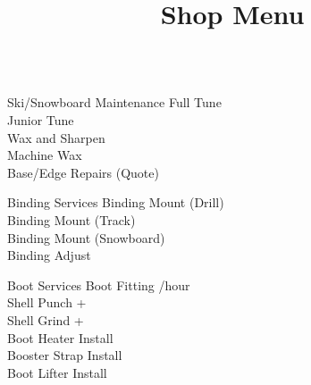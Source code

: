 \documentclass{beamer}
\title{Shop Menu}
\begin{document}
  \begin{frame}[fragile]\centering
    \begin{columns}[T]
        \begin{column}{0.90\textwidth}
            \begin{block}{Ski/Snowboard Maintenance}
                Full Tune \hfill {}\\
                Junior Tune \hfill {}\\
                Wax and Sharpen \hfill {}\\
                Machine Wax \hfill{}\\
                Base/Edge Repairs \hfill(Quote)
            \end{block}
             \begin{block}{Binding Services}
                Binding Mount (Drill) \hfill {}\\
                Binding Mount (Track) \hfill {}\\
                Binding Mount (Snowboard)\hfill {}\\
                Binding Adjust \hfill {}
            \end{block}
            \begin{block}{Boot Services}
                Boot Fitting \hfill {}/hour\\
                Shell Punch \hfill {}+\\
                Shell Grind \hfill {}+\\
                Boot Heater Install \hfill {}\\
                Booster Strap Install \hfill {}\\
                Boot Lifter Install \hfill {}
            \end{block}
        \end{column}
    \end{columns}
  \end{frame}
\end{document}
